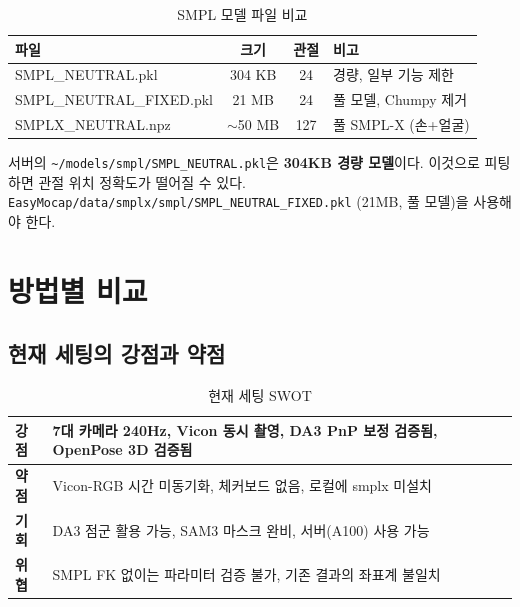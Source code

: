 \documentclass[11pt, a4paper]{report}
\begin{document}
\begin{table}[H]
\centering
\caption{SMPL 모델 파일 비교}
\renewcommand{\arraystretch}{1.3}
\begin{tabularx}{\textwidth}{lccX}
\toprule
\textbf{파일} & \textbf{크기} & \textbf{관절} & \textbf{비고} \\
\midrule
SMPL\_NEUTRAL.pkl & 304 KB & 24 & 경량, 일부 기능 제한 \\
SMPL\_NEUTRAL\_FIXED.pkl & 21 MB & 24 & 풀 모델, Chumpy 제거 \\
SMPLX\_NEUTRAL.npz & $\sim$50 MB & 127 & 풀 SMPL-X (손+얼굴) \\
\bottomrule
\end{tabularx}
\end{table}

\begin{warningbox}
서버의 \texttt{{\textasciitilde}/models/smpl/SMPL\_NEUTRAL.pkl}은 \textbf{304KB 경량 모델}이다.
이것으로 피팅하면 관절 위치 정확도가 떨어질 수 있다.
\texttt{EasyMocap/data/smplx/smpl/SMPL\_NEUTRAL\_FIXED.pkl} (21MB, 풀 모델)을 사용해야 한다.
\end{warningbox}


\chapter{방법별 비교}

\section{현재 세팅의 강점과 약점}

\begin{table}[H]
\centering
\caption{현재 세팅 SWOT}
\renewcommand{\arraystretch}{1.3}
\begin{tabularx}{\textwidth}{lX}
\toprule
\textbf{강점} & 7대 카메라 240Hz, Vicon 동시 촬영, DA3 PnP 보정 검증됨, OpenPose 3D 검증됨 \\
\midrule
\textbf{약점} & Vicon-RGB 시간 미동기화, 체커보드 없음, 로컬에 smplx 미설치 \\
\midrule
\textbf{기회} & DA3 점군 활용 가능, SAM3 마스크 완비, 서버(A100) 사용 가능 \\
\midrule
\textbf{위협} & SMPL FK 없이는 파라미터 검증 불가, 기존 결과의 좌표계 불일치 \\
\bottomrule
\end{tabularx}
\end{table}
\end{document}
